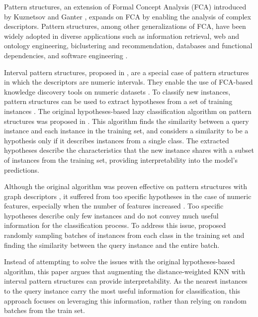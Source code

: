\documentclass[
]{ceurart}
\begin{document}
Pattern structures, an extension of Formal Concept Analysis (FCA) introduced by Kuznetsov and Ganter \cite{ganter2001pattern}, expands on FCA by enabling the analysis of complex descriptors. Pattern structures, among other generalizations of FCA, have been widely adopted in diverse applications such as information retrieval, web and ontology engineering, biclustering and recommendation, databases and functional dependencies, and software engineering \cite{ferre2020formal}.

Interval pattern structures, proposed in \cite{kuznetsov2013fitting}, are a special case of pattern structures in which the descriptors are numeric intervals. They enable the use of FCA-based knowledge discovery tools on numeric datasets \cite{ kaytoue2011mining}. To classify new instances, pattern structures can be used to extract hypotheses from a set of training instances \cite{kuznetsov2013scalable}. The original hypotheses-based lazy classification algorithm on pattern structures was proposed in \cite{ganter2003hypotheses}. This algorithm finds the similarity between a query instance and each instance in the training set, and considers a similarity to be a hypothesis only if it describes instances from a single class. The extracted hypotheses describe the characteristics that the new instance shares with a subset of instances from the training set, providing interpretability into the model's predictions.

Although the original algorithm was proven effective on pattern structures with graph descriptors \cite{kuznetsov2013scalable}, it suffered from too specific hypotheses in the case of numeric features, especially when the number of features increased \cite{masyutin2015lazy}. Too specific hypotheses describe only few instances and do not convey much useful information for the classification process. To address this issue, \cite{masyutin2015lazy} proposed randomly sampling batches of instances from each class in the training set and finding the similarity between the query instance and the entire batch.


Instead of attempting to solve the issues with the original hypotheses-based algorithm, this paper argues that augmenting the distance-weighted KNN with interval pattern structures can provide interpretability. As the nearest instances to the query instance carry the most useful information for classification, this approach focuses on leveraging this information, rather than relying on random batches from the train set.
\end{document}
